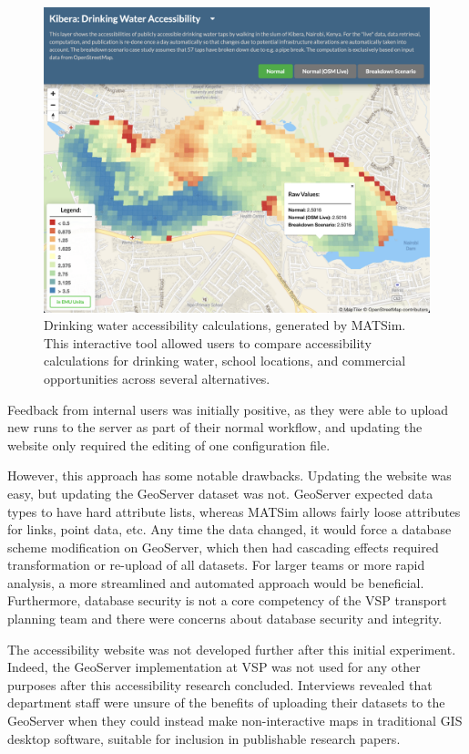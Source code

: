 \begin{figure}[!ht]
  \includegraphics[width=\textwidth]{chapters/12-server-experiments/images/nairobi.png}
  \caption[Drinking water accessibility calculations, generated by MATSim]{Drinking water accessibility calculations, generated by MATSim. This interactive tool allowed users to compare accessibility calculations for drinking water, school locations, and commercial opportunities across several alternatives.}
  \label{fig:nairobi}
\end{figure}

Feedback from internal users was initially positive, as they were able to upload new runs to the server as part of their normal workflow, and updating the website only required the editing of one configuration file.

However, this approach has some notable drawbacks. Updating the website was easy, but updating the GeoServer dataset was not. GeoServer expected data types to have hard attribute lists, whereas MATSim allows fairly loose attributes for links, point data, etc. Any time the data changed, it would force a database scheme modification on GeoServer, which then had cascading effects required transformation or re-upload of all datasets. For larger teams or more rapid analysis, a more streamlined and automated approach would be beneficial. Furthermore, database security is not a core competency of the VSP transport planning team and there were concerns about database security and integrity.

The accessibility website was not developed further after this initial experiment. Indeed, the GeoServer implementation at VSP was not used for any other purposes after this accessibility research concluded. Interviews revealed that department staff were unsure of the benefits of uploading their datasets to the GeoServer when they could instead make non-interactive maps in traditional GIS desktop software, suitable for inclusion in publishable research papers.

